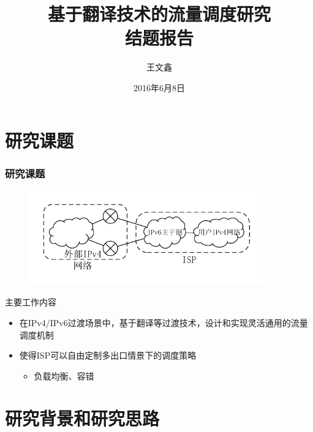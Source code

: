\documentclass{beamer}
\title{
  基于翻译技术的流量调度研究 \\
  结题报告
}
\author{王文鑫}
\date{2016年6月8日}
\begin{document}
\begin{frame}
  \titlepage
\end{frame}

\section{研究课题}

\begin{frame}
  \frametitle{研究课题}

  \vspace{-1em}
  \begin{figure}
    \includegraphics[width=0.9\textwidth]{figs/0-purpose.pdf}
  \end{figure}
  \vspace{-2em}

  \begin{block}{主要工作内容}
    \begin{itemize}
    \item 在IPv4/IPv6过渡场景中，基于翻译等过渡技术，设计和实现灵活通用的流量调度机制
    \item 使得ISP可以自由定制多出口情景下的调度策略
      \begin{itemize}
      \item 负载均衡、容错
      \end{itemize}
    \end{itemize}
  \end{block}
\end{frame}

\section{研究背景和研究思路}
\end{document}
